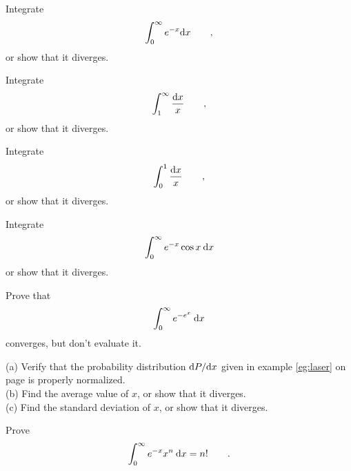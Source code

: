 \begin{hwsection}

\begin{hw}
Integrate
\begin{equation*}
  \int_0^\infty e^{-x} \textup{d} x \qquad ,
\end{equation*}
or show that it diverges.
\end{hw}

\begin{hw}
Integrate
\begin{equation*}
  \int_1^\infty \frac{\textup{d} x}{x} \qquad ,
\end{equation*}
or show that it diverges.
\end{hw}

\begin{hw}
Integrate
\begin{equation*}
  \int_0^1 \frac{\textup{d} x}{x} \qquad ,
\end{equation*}
or show that it diverges.
\end{hw}

\begin{hw}
Integrate
\begin{equation*}
  \int_0^\infty e^{-x}\cos x \: \textup{d} x
\end{equation*}
or show that it diverges.
\end{hw}

\begin{hw}
Prove that
\begin{equation*}
  \int_0^\infty e^{-e^x} \: \textup{d} x
\end{equation*}
converges, but don't evaluate it.
\end{hw}

\begin{hw}\label{hw:laser}
(a) Verify that the probability distribution $\textup{d} P/\textup{d} x$ given in example \ref{eg:laser} on page \pageref{eg:laser}
is properly normalized.\\
(b) Find the average value of $x$, or show that it diverges.\\
(c) Find the standard deviation of $x$, or show that it diverges.
\end{hw}

\begin{hw}[2]
Prove
\begin{equation*}
  \int_0^\infty e^{-x}x^n\:\textup{d} x = n! \qquad .
\end{equation*}
\end{hw}

\end{hwsection}
